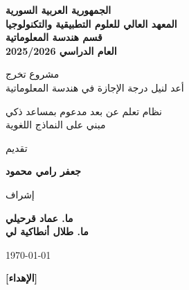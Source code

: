 \documentclass[12pt,letterpaper,oneside]{report}
\begin{document}
\pagestyle{empty}

\begin{center}
  {\bfseries\fontsize{12}{16}\selectfont
   الجمهورية العربية السورية\\
   المعهد العالي للعلوم التطبيقية والتكنولوجيا\\
   قسم هندسة المعلوماتية\\
   العام الدراسي 2025/2026\par}

  \vspace{2.5cm}
  {\fontsize{14.4}{18}\selectfont مشروع تخرج\\[6pt]
   أعد لنيل درجة الإجازة في هندسة المعلوماتية\par}

  \vspace{2cm}
  {\fontsize{22.4}{28}\selectfont
   نظام تعلم عن بعد مدعوم بمساعد ذكي\\[6pt]
   مبني على النماذج اللغوية\par}

  \vspace{2.5cm}
  {\fontsize{14.4}{18}\selectfont تقديم\par}
  {\bfseries\fontsize{14.4}{18}\selectfont جعفر رامي محمود\par}

  \vspace{1.5cm}
  {\fontsize{14.4}{18}\selectfont إشراف\par}
  {\bfseries\fontsize{14.4}{18}\selectfont ما. عماد قرحيلي\\[6pt]
   ما. طلال أنطاكية لي\par}

  \vfill
  {\fontsize{14.4}{18}\selectfont \today\par}
\end{center}
\clearpage

\vspace*{4cm}
\begin{center}\bfseries
  [الإهداء]
\end{center}
\clearpage
\end{document}
